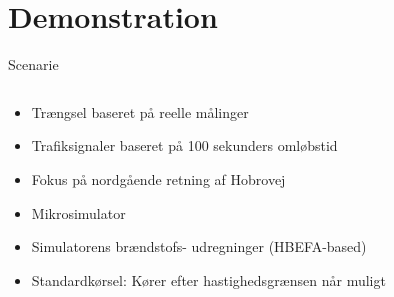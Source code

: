 \section{Demonstration}
\begin{frame}{Scenarie}
\begin{columns}
\begin{column}{0.6\textwidth}
\begin{itemize}
\item Trængsel baseret på reelle målinger
\item Trafiksignaler baseret på 100 sekunders omløbstid
\item Fokus på nordgående retning af Hobrovej
\item Mikrosimulator
\item Simulatorens brændstofs- udregninger (HBEFA-based)
\item Standardkørsel: Kører efter hastighedsgrænsen når muligt
\end{itemize}
\end{column}


\end{columns}
\end{frame}

